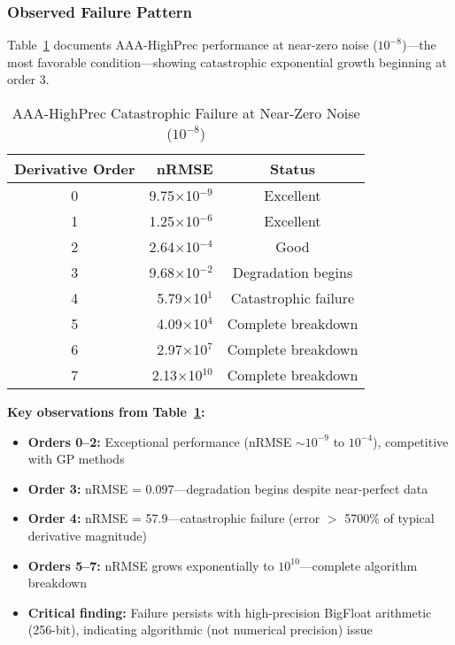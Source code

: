 \subsubsection{Observed Failure Pattern}

Table~\ref{tab:aaa_failure} documents AAA-HighPrec performance at near-zero noise ($10^{-8}$)—the most favorable condition—showing catastrophic exponential growth beginning at order 3.

\begin{table}[htbp]
\centering
\caption{AAA-HighPrec Catastrophic Failure at Near-Zero Noise ($10^{-8}$)}
\label{tab:aaa_failure}
\begin{tabular}{crc}
\toprule
\textbf{Derivative Order} & \textbf{nRMSE} & \textbf{Status} \\
\midrule
0 & 9.75$\times$10$^{-9}$ & Excellent \\
1 & 1.25$\times$10$^{-6}$ & Excellent \\
2 & 2.64$\times$10$^{-4}$ & Good \\
3 & 9.68$\times$10$^{-2}$ & Degradation begins \\
4 & 5.79$\times$10$^{1}$ & Catastrophic failure \\
5 & 4.09$\times$10$^{4}$ & Complete breakdown \\
6 & 2.97$\times$10$^{7}$ & Complete breakdown \\
7 & 2.13$\times$10$^{10}$ & Complete breakdown \\
\bottomrule
\end{tabular}
\end{table}

\textbf{Key observations from Table~\ref{tab:aaa_failure}:}
\begin{itemize}
    \item \textbf{Orders 0--2:} Exceptional performance (nRMSE $\sim 10^{-9}$ to $10^{-4}$), competitive with GP methods
    \item \textbf{Order 3:} nRMSE = 0.097—degradation begins despite near-perfect data
    \item \textbf{Order 4:} nRMSE = 57.9—catastrophic failure (error $>$ 5700\% of typical derivative magnitude)
    \item \textbf{Orders 5--7:} nRMSE grows exponentially to $10^{10}$—complete algorithm breakdown
    \item \textbf{Critical finding:} Failure persists with high-precision BigFloat arithmetic (256-bit), indicating algorithmic (not numerical precision) issue
\end{itemize}

